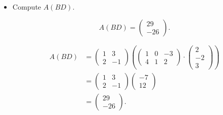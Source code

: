\begin{Exercise}
\begin{itemize}
\item Compute $A(B D)$.
\begin{answer}
$$
A(B D) = \begin{pmatrix}
29 \\
-26
\end{pmatrix}.
$$
\end{answer}
\begin{solution}
\begin{align*}
A(B D)
&= \begin{pmatrix}
1 & 3 \\
2 & -1
\end{pmatrix} \left( \begin{pmatrix}
1 & 0 & -3 \\
4 & 1 & 2
\end{pmatrix} \cdot \begin{pmatrix}
2 \\
-2 \\
3
\end{pmatrix} \right)\\
&= \begin{pmatrix}
1 & 3 \\
2 & -1
\end{pmatrix} \begin{pmatrix}
-7 \\
12
\end{pmatrix} \\
&= \begin{pmatrix}
29 \\
-26
\end{pmatrix}.
\end{align*}
\end{solution}

\end{itemize}
\end{Exercise}